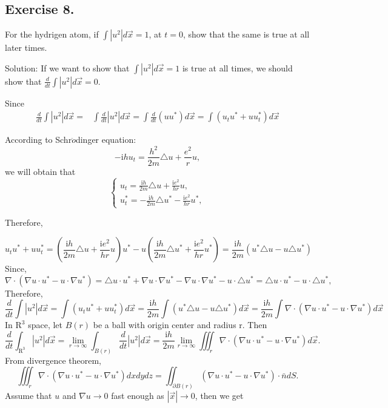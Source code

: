 \documentclass{article}
\begin{document}
		\subsection{Exercise 8.}
	For the hydrigen atom, if $ \int \left | u^2 \right | d \vec{x } =1$, at $t=0$, show that the same is true at all later times.
		
		Solution: If we want to show that $ \int \left | u^2 \right | d \vec{x } =1$ is true at all times, we should show that $\frac{d}{dt}\int \left | u^2 \right | d \vec{x } =0$.
                  
		Since
		\begin{align*}
			 \frac{d}{dt}\int \left | u^2 \right | d \vec{x } =&
			 \int \frac{d}{dt} \left | u^2 \right | d \vec{x }=
			 \int \frac{d}{dt} \left(uu^* \right)d \vec{x }=
			 \int\left(  u_{t}u^*+uu_{t}^*\right) d \vec{x }
		\end{align*}

		According to Schr$\ddot{o}$dinger equation: 
		\[-\mathrm{i}hu_{t}=\frac{h^2}{2m}\triangle u+ \frac{e^2}{r}u,\]
		we will obtain that
		\begin{equation*}
			\begin{cases}
				u_{t}=\frac{\mathrm{i}h}{2m}\triangle u+ \frac{\mathrm{i}e^2}{hr}u,
				\\
				u_{t}^*=-\frac{\mathrm{i}h}{2m}\triangle u^*-\frac{\mathrm{i}e^2}{hr}u^*,
			\end{cases}
		\end{equation*}
		

		Therefore,

			\[u_{t}u^*+uu_{t}^*=(\frac{\mathrm{i}h}{2m}\triangle u+\frac{\mathrm{i}e^2}{hr}u)u^*-u(\frac{\mathrm{i}h}{2m}\triangle u^*+\frac{\mathrm{i}e^2}{hr}u^*)= \frac{\mathrm{i}h}{2m} (u^*\triangle u -u\triangle u^*) \]
			Since, \[\nabla \cdot (\nabla u \cdot u^* -u\cdot \nabla u^*)= \triangle u \cdot u^*+ \nabla u\cdot \nabla u^*- \nabla u\cdot \nabla u^*- u\cdot\triangle u^*=\triangle u \cdot u^*-u\cdot\triangle u^*,\]
			Therefore, \[ \frac{d}{dt}\int \left | u^2 \right | d \vec{x }=\int(u_{t}u^*+uu_{t}^*)  d \vec{x } = \frac{\mathrm{i}h}{2m}\int(u^*\triangle u -u\triangle u^*)d \vec{x }=\frac{\mathrm{i}h}{2m}\int \nabla \cdot (\nabla u \cdot u^* -u\cdot \nabla u^*)d \vec{x }\]
            In $\mathrm{R}^3$ space, let $B(r)$ be a ball with origin center and radius r.
			Then \[ \frac{d}{dt}\int_{\mathrm{R^3} }^{}  \left | u^2 \right | d \vec{x }= \lim_{r \to \infty}\int_{B(r)}\frac{d}{dt} \left | u^2 \right | d \vec{x }= \frac{\mathrm{i}h}{2m}\lim_{r \to \infty}\iiint_{r}^{} \nabla \cdot (\nabla u \cdot u^* -u\cdot \nabla u^*)d \vec{x }.\]
			From divergence theorem,
			\[\iiint_{r}^{} \nabla \cdot (\nabla u \cdot u^* -u\cdot \nabla u^*)dx dy dz= \iint_{\partial B(r)}^{}(\nabla u \cdot u^* -u\cdot \nabla u^*) \cdot \bar{n} dS.	\]
			Assume that $u$ and $\nabla u \to 0$ fast enough as $\left | \vec{x} \right | \to 0$, then we get
		
\end{document}
